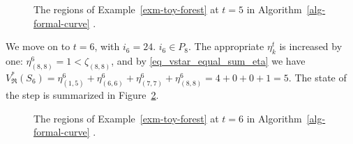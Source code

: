 \documentclass[
  11pt,
  a4paper,
]{article}
\theoremstyle{definition}
\theoremstyle{plain}
\theoremstyle{plain}
\theoremstyle{plain}
\theoremstyle{definition}
\theoremstyle{remark}
\begin{document}
\begin{figure}


\caption{\label{fig-t5}The regions of Example~\ref{exm-toy-forest} at
\(t=5\) in  Algorithm~\ref{alg-formal-curve} .}

\end{figure}%

We move on to \(t=6\), with \(i_6=24\). \(i_6\in P_8\). The appropriate
\(\eta_k^t\) is increased by one: \(\eta_{(8, 8)}^6=1<\zeta_{(8,8)}\),
and by \eqref{eq_vstar_equal_sum_eta} we have
\(V^*_{\mathfrak{R}}(S_6)=\eta_{(1, 5)}^6+\eta_{(6, 6)}^6+\eta_{(7, 7)}^6+\eta_{(8, 8)}^6=4+0+0+1=5\).
The state of the step is summarized in Figure~\ref{fig-t6}.

\begin{figure}


\caption{\label{fig-t6}The regions of Example~\ref{exm-toy-forest} at
\(t=6\) in  Algorithm~\ref{alg-formal-curve} .}

\end{figure}%
\end{document}
